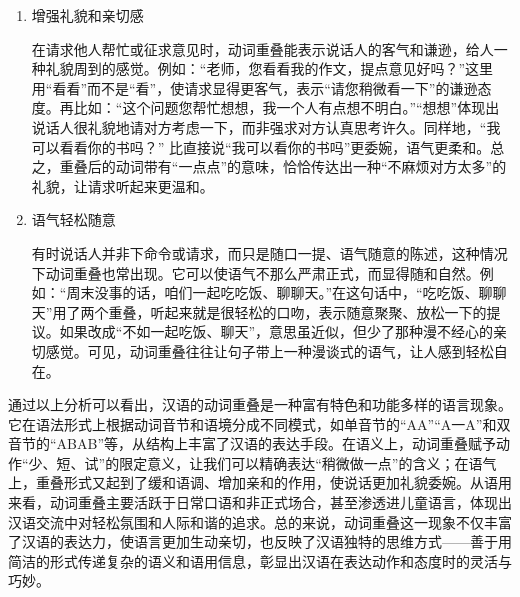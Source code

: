 \documentclass[10pt]{ctexart}
\begin{document}
\begin{enumerate}
\begin{enumerate}[label=(\arabic*)]
        直接用不重叠的动词命令别人做事，语气可能显得生硬；而用重叠形式则会柔和许多，带有请托、建议的味道。例如，比起``你等我''，``你等一等我''听起来更客气；又如把``帮我拿一下那个杯子''说成``帮我拿拿那个杯子''，语气就没有那么命令式，而显得随和。可见，在建议或劝说他人时，重叠形式让话语更委婉，对方更容易接受。

        \item 增强礼貌和亲切感
        
        在请求他人帮忙或征求意见时，动词重叠能表示说话人的客气和谦逊，给人一种礼貌周到的感觉。例如：``老师，您看看我的作文，提点意见好吗？''这里用``看看''而不是``看''，使请求显得更客气，表示``请您稍微看一下''的谦逊态度。再比如：``这个问题您帮忙想想，我一个人有点想不明白。''``想想''体现出说话人很礼貌地请对方考虑一下，而非强求对方认真思考许久。同样地，``我可以看看你的书吗？'' 比直接说``我可以看你的书吗''更委婉，语气更柔和。总之，重叠后的动词带有``一点点''的意味，恰恰传达出一种``不麻烦对方太多''的礼貌，让请求听起来更温和。

        \item 语气轻松随意
        
        有时说话人并非下命令或请求，而只是随口一提、语气随意的陈述，这种情况下动词重叠也常出现。它可以使语气不那么严肃正式，而显得随和自然。例如：``周末没事的话，咱们一起吃吃饭、聊聊天。''在这句话中，``吃吃饭、聊聊天''用了两个重叠，听起来就是很轻松的口吻，表示随意聚聚、放松一下的提议。如果改成``不如一起吃饭、聊天''，意思虽近似，但少了那种漫不经心的亲切感觉。可见，动词重叠往往让句子带上一种漫谈式的语气，让人感到轻松自在。
    \end{enumerate}
\end{enumerate}

通过以上分析可以看出，汉语的动词重叠是一种富有特色和功能多样的语言现象。它在语法形式上根据动词音节和语境分成不同模式，如单音节的``AA''``A一A''和双音节的``ABAB''等，从结构上丰富了汉语的表达手段。在语义上，动词重叠赋予动作``少、短、试''的限定意义，让我们可以精确表达``稍微做一点''的含义；在语气上，重叠形式又起到了缓和语调、增加亲和的作用，使说话更加礼貌委婉。从语用来看，动词重叠主要活跃于日常口语和非正式场合，甚至渗透进儿童语言，体现出汉语交流中对轻松氛围和人际和谐的追求。总的来说，动词重叠这一现象不仅丰富了汉语的表达力，使语言更加生动亲切，也反映了汉语独特的思维方式——善于用简洁的形式传递复杂的语义和语用信息，彰显出汉语在表达动作和态度时的灵活与巧妙。
\end{document}

